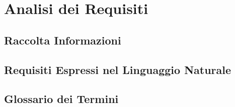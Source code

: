 \documentclass[12pt]{article} %
\begin{document}








\tableofcontents

\newpage


	\section{Analisi dei Requisiti}

	



		\subsection{Raccolta Informazioni} %

		

		\subsection{Requisiti Espressi nel Linguaggio Naturale}

		

		\subsection{Glossario dei Termini}

		
		\newpage
\end{document}
